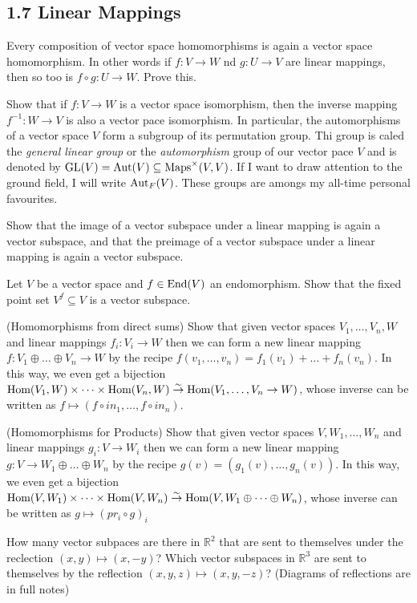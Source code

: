 \subsection*{1.7 Linear Mappings}
\item Every composition of vector space homomorphisms is again a vector space homomorphism. In other words if $f : V \to W$ nd $g : U \to V$ are linear mappings, then so too is $f \circ g : U \to W$. Prove this.
\item Show that if $f : V \to W$ is a vector space isomorphism, then the inverse mapping $f^{-1} : W \to V$ is also a vector pace isomorphism. In particular, the automorphisms of a vector space $V$ form a subgroup of its permutation group. Thi group is caled the \emph{general linear group} or the \emph{automorphism} group of our vector pace $V$ and is denoted by $\text{GL}(V) = \text{Aut}(V) \subseteq \text{Maps}^{\times}(V, V)$. If I want to draw attention to the ground field, I will write $\text{Aut}_{F}(V)$. These groups are amongs my all-time personal favourites.
\item Show that the image of a vector subspace under a linear mapping is again a vector subspace, and that the preimage of a vector subspace under a linear mapping is again a vector subspace.
\item Let $V$ be a vector space and $f \in \text{End}(V)$ an endomorphism. Show that the fixed point set $V^{f} \subseteq V$ is a vector subspace.
\item (Homomorphisms from direct sums) Show that given vector spaces $V_{1}, \dots, V_{n}, W$ and linear mappings $f_{i} : V_{i} \to W$ then we can form a new linear mapping $f : V_{1} \oplus \dots \oplus V_{n} \to W$ by the recipe $f(v_{1}, \dots, v_{n}) = f_{1}(v_{1}) + \dots + f_{n}(v_{n})$. In this way, we even get a bijection $\text{Hom}(V_{1}, W) \times \dots \times \text{Hom}(V_{n}, W) \stackrel{\sim}{\to} \text{Hom}(V_{1}, \dots, V_{n} \to W)$, whose inverse can be written as $f \mapsto (f \circ in_{1}, \dots, f \circ in_{n})$.
\item (Homomorphisms for Products) Show that given vector spaces $V, W_{1}, \dots, W_{n}$ and linear mappings $g_{i} : V \to W_{i}$ then we can form a new linear mapping $g : V \to W_{1} \oplus \dots \oplus W_{n}$ by the recipe $g(v) = (g_{1}(v), \dots, g_{n}(v))$. In this way, we even get a bijection $\text{Hom}(V, W_{1}) \times \dots \times \text{Hom}(V, W_{n}) \stackrel{\sim}{\to} \text{Hom}(V, W_{1} \oplus \dots \oplus W_{n})$, whose inverse can be written as $g \mapsto (pr_{i} \circ g)_{i}$
\item How many vector subpaces are there in $\mathbb{R}^{2}$ that are sent to themselves under the reclection $(x,y) \mapsto (x, -y)$? Which vector subspaces in $\mathbb{R}^{3}$ are sent to themselves by the reflection $(x,y,z) \mapsto (x,y,-z)$? (Diagrams of reflections are in full notes)
